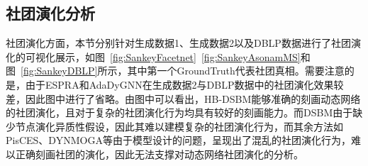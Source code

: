 \subsection{社团演化分析}


社团演化方面，本节分别针对生成数据1、生成数据2以及DBLP数据进行了社团演化的可视化展示，如图~\ref{fig:SankeyFacetnet}~\ref{fig:SankeyAsonamMS}和图~\ref{fig:SankeyDBLP}所示，其中第一个GroundTruth代表社团真相。需要注意的是，由于ESPRA和AdaDyGNN在生成数据2与DBLP数据中的社团演化效果较差，因此图中进行了省略。由图中可以看出，HB-DSBM能够准确的刻画动态网络的社团演化，且对于复杂的社团演化行为均具有较好的刻画能力。而DSBM由于缺少节点演化异质性假设，因此其难以建模复杂的社团演化行为，而其余方法如PisCES、DYNMOGA等由于模型设计的问题，呈现出了混乱的社团演化行为，难以正确刻画社团的演化，因此无法支撑对动态网络社团演化的分析。




